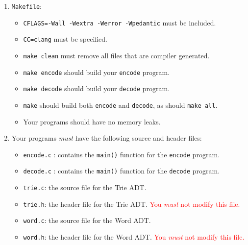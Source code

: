 \documentclass{article}
\begin{document}
\begin{enumerate}
    \item \texttt{Makefile}:
        \begin{itemize}
            \item \texttt{CFLAGS=-Wall -Wextra -Werror -Wpedantic} must
                be included.

            \item \texttt{CC=clang} must be specified.

            \item \texttt{make clean} must remove all files that are compiler
                generated.

            \item \texttt{make encode} should build your \texttt{encode}
                program.

            \item \texttt{make decode} should build your \texttt{decode}
                program.

            \item \texttt{make} should build both \texttt{encode} and
                \texttt{decode}, as should \texttt{make all}.

            \item Your programs should have no memory leaks.
        \end{itemize}

    \item Your programs \emph{must} have the following source and header files:
        \begin{itemize}
            \item \texttt{encode.c} : contains the \texttt{main()} function for
                the \texttt{encode} program.

            \item \texttt{decode.c} : contains the \texttt{main()} function for
                the \texttt{decode} program.

            \item \texttt{trie.c}: the source file for the Trie ADT.

            \item \texttt{trie.h}: the header file for the Trie ADT.
                \textcolor{red}{You \emph{must} not modify this file.}

            \item \texttt{word.c}: the source file for the Word ADT.

            \item \texttt{word.h}: the header file for the Word ADT.
                \textcolor{red}{You \emph{must} not modify this file.}


\end{itemize}
\end{enumerate}
\end{document}
